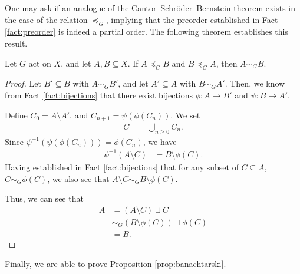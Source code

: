 One may ask if an analogue of the Cantor--Schröder--Bernstein theorem exists in the case of the relation $\preceq_{G}$, implying that the preorder established in Fact \ref{fact:preorder} is indeed a partial order. The following theorem establishes this result.
\begin{theorem}\label{thm:csb_for_equidecomposability}
  Let $G$ act on $X$, and let $A,B\subseteq X$. If $A\preceq_{G}B$ and $B\preceq_{G}A$, then $A\sim_{G}B$.
\end{theorem}
\begin{proof}
  Let $B'\subseteq B$ with $A\sim_{G}B'$, and let $A'\subseteq A$ with $B\sim_{G}A'$. Then, we know from Fact \ref{fact:bijections} that there exist bijections $\phi: A\rightarrow B'$ and $\psi: B\rightarrow A'$.\newline

  Define $C_0 = A\setminus A'$, and $C_{n+1} = \psi\left(\phi\left(C_n\right)\right)$. We set
  \begin{align*}
    C &= \bigcup_{n\geq 0}C_{n}.
  \end{align*}
  Since $\psi^{-1}\left(\psi\left(\phi\left(C_n\right)\right)\right) = \phi\left(C_n\right)$, we have
  \begin{align*}
    \psi^{-1}\left(A\setminus C\right) &= B\setminus \phi(C).
  \end{align*}
  Having established in Fact \ref{fact:bijections} that for any subset of $C\subseteq A$, $C\sim_{G} \phi(C)$, we also see that $A\setminus C \sim_{G} B\setminus \phi(C)$.\newline

  Thus, we can see that
  \begin{align*}
    A &= \left(A\setminus C\right)\sqcup C\\
      &\sim_{G}\left(B\setminus \phi(C)\right)\sqcup \phi(C)\\
      &= B.
  \end{align*}
  
\end{proof}
Finally, we are able to prove Proposition \ref{prop:banachtarski}.
